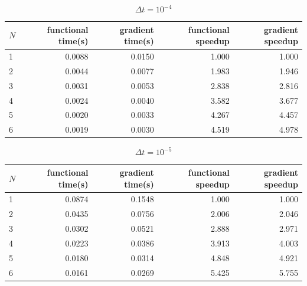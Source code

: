 \begin{table}[!h]
\centering
\caption{$\Delta t=10^{-4}$}
\label{Speed_table2}
\begin{tabular}{lrrrr}
\toprule
{} $N$&  functional time(s) &  gradient time(s) &  functional speedup &  gradient speedup \\
\midrule
1 &           0.0088 &          0.0150 &            1.000 &          1.000 \\
2 &           0.0044 &          0.0077 &            1.983 &          1.946 \\
3 &           0.0031 &          0.0053 &            2.838 &          2.816 \\
4 &           0.0024 &          0.0040 &            3.582 &          3.677 \\
5 &           0.0020 &          0.0033 &            4.267 &          4.457 \\
6 &           0.0019 &          0.0030 &            4.519 &          4.978 \\
\bottomrule
\end{tabular}
\end{table}
\begin{table}[!h]
\centering
\caption{$\Delta t=10^{-5}$\label{Speed_table3}}
\begin{tabular}{lrrrr}
\toprule
{} $N$&  functional time(s) &  gradient time(s) &  functional speedup &  gradient speedup \\
\midrule
1 &           0.0874 &          0.1548 &            1.000 &          1.000 \\
2 &           0.0435 &          0.0756 &            2.006 &          2.046 \\
3 &           0.0302 &          0.0521 &            2.888 &          2.971 \\
4 &           0.0223 &          0.0386 &            3.913 &          4.003 \\
5 &           0.0180 &          0.0314 &            4.848 &          4.921 \\
6 &           0.0161 &          0.0269 &            5.425 &          5.755 \\
\bottomrule
\end{tabular}
\end{table}
